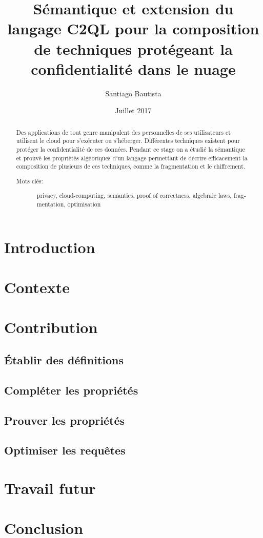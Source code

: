 \documentclass[a4paper,11pt]{article}
\author{Santiago Bautista}
\date{Juillet 2017}
\title{Sémantique et extension du langage C2QL pour la composition de techniques protégeant la confidentialité dans le nuage}
\begin{document}
\maketitle

\begin{abstract}
	Des applications de tout genre manipulent des personnelles de ses utilisateurs
	et utilisent le cloud pour s'exécuter ou s'héberger.
	Différentes techniques existent pour protéger la confidentialité de ces données.
	Pendant ce stage on a étudié la sémantique et prouvé les propriétés algébriques d'un langage permettant de décrire
	efficacement la composition de plusieurs de ces techniques, comme la fragmentation et le chiffrement.
	\begin{description}
		\item[Mots clés:]{\begin{otherlanguage}{english}
				privacy, cloud-computing, semantics, proof of correctness, algebraic laws, fragmentation, optimisation
			\end{otherlanguage}} 
	\end{description} 
	
\end{abstract}

\tableofcontents

\section{Introduction}


\section{Contexte}


\section{Contribution}


\subsection{Établir des définitions}


\subsection{Compléter les propriétés}


\subsection{Prouver les propriétés}


\subsection{Optimiser les requêtes}


\section{Travail futur}


\section{Conclusion}


 \newpage
 \appendix
\end{document}
